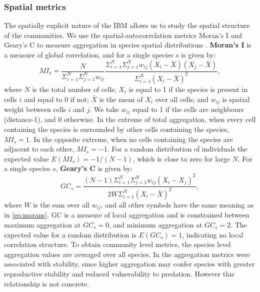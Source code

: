 \subsubsection{Spatial metrics}
\label{sec:def_spatial_metrics}
The spatially explicit nature of the IBM allows us to study the spatial structure of the communities. We use the spatial-autocorrelation metrics Moran's I and Geary's C to measure aggregation in species spatial distributions \cite{dale2014spatial, lurgi2015effects}. \textbf{Moran's I} is a measure of global correlation, and for a single species $s$ is given by:
\begin{equation}
MI_s = \frac{N}{\Sigma_{i=1}^N \Sigma_{j=1}^N w_{ij}}  \frac{\Sigma_{i=1}^N \Sigma_{j=1}^N w_{ij}(X_i - \bar{X})(X_j - \bar{X})}{\Sigma_{i=1}^N (X_i - \bar{X})^2},
\label{eq:morans}
\end{equation}
%
where $N$ is the total number of cells; $X_i$ is equal to 1 if the species is present in cells $i$ and equal to 0 if not; $\bar{X}$ is the mean of $X_i$ over all cells; and $w_{ij}$ is spatial weight between cells $i$ and $j$. We take $w_{ij}$ equal to 1 if the cells are neighbours (distance-1), and 0 otherwise. In the extreme of total aggregation, when every cell containing the species is surrounded by other cells containing the species, $MI_s=1$. In the opposite extreme, when no cells containing the species are adjacent to each other, $MI_s=-1$. For a random distribution of individuals the expected value $E(MI_s) = -1/(N-1)$, which is close to zero for large $N$. For a single species $s$, \textbf{Geary's C} is given by:
\begin{equation}
GC_s = \frac{(N-1)\Sigma_{i=1}^N \Sigma_{j=1}^N w_{ij}(X_i - X_j)^2}{2W \Sigma_{i=1}^N (X_i - \bar{X})^2},
\label{eq:gearys}
\end{equation}
%
where $W$ is the sum over all $w_{ij}$, and all other symbols have the same meaning as in \eqref{eq:morans}. GC is a measure of local aggregation and is constrained between maximum aggregation at $GC_s=0$, and minimum aggregation at $GC_s=2$. The expected value for a random distribution is $E(GC_s)=1$, indicating no local correlation structure. To obtain community level metrics, the species level aggregation values are averaged over all species. In \cite{lurgi2015effects} the aggregation metrics were associated with stability, since higher aggregation may confer species with greater reproductive stability and reduced vulnerability to predation. However this relationship is not concrete.

